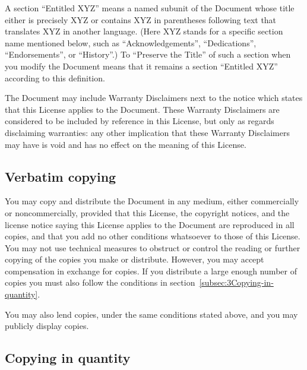 {\tiny{}A section \textsf{``}Entitled XYZ\textsf{''} means a named subunit of the
Document whose title either is precisely XYZ or contains XYZ in parentheses
following text that translates XYZ in another language. (Here XYZ
stands for a specific section name mentioned below, such as \textquotedblleft Acknowledgements\textquotedblright ,
\textquotedblleft Dedications\textquotedblright , \textquotedblleft Endorsements\textquotedblright ,
or \textquotedblleft History\textquotedblright .) To \textquotedblleft Preserve
the Title\textquotedblright{} of such a section when you modify the
Document means that it remains a section \textquotedblleft Entitled
XYZ\textquotedblright{} according to this definition.}{\tiny\par}

{\tiny{}The Document may include Warranty Disclaimers next to the
notice which states that this License applies to the Document. These
Warranty Disclaimers are considered to be included by reference in
this License, but only as regards disclaiming warranties: any other
implication that these Warranty Disclaimers may have is void and has
no effect on the meaning of this License.}{\tiny\par}

\subsection{Verbatim copying\label{subsec:2Verbatim-copying}}

{\tiny{}You may copy and distribute the Document in any medium, either
commercially or noncommercially, provided that this License, the copyright
notices, and the license notice saying this License applies to the
Document are reproduced in all copies, and that you add no other conditions
whatsoever to those of this License. You may not use technical measures
to obstruct or control the reading or further copying of the copies
you make or distribute. However, you may accept compensation in exchange
for copies. If you distribute a large enough number of copies you
must also follow the conditions in section~\ref{subsec:3Copying-in-quantity}.}{\tiny\par}

{\tiny{}You may also lend copies, under the same conditions stated
above, and you may publicly display copies.}{\tiny\par}

\subsection{Copying in quantity\label{subsec:3Copying-in-quantity}}


